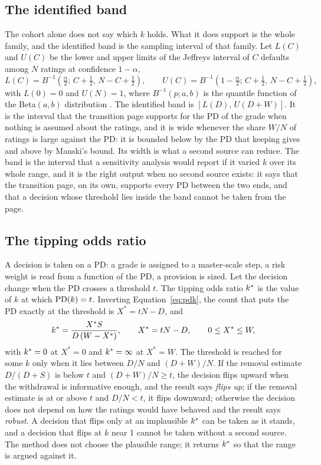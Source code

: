 \subsection{The identified band}

The cohort alone does not say which $k$ holds. What it does support is the whole family, and the identified band is the sampling interval of that family. Let $L(C)$ and $U(C)$ be the lower and upper limits of the Jeffreys interval of $C$ defaults among $N$ ratings at confidence $1-\alpha$,
\begin{equation}
L(C)=B^{-1}\!\left(\tfrac{\alpha}{2};\,C+\tfrac12,\,N-C+\tfrac12\right),\qquad U(C)=B^{-1}\!\left(1-\tfrac{\alpha}{2};\,C+\tfrac12,\,N-C+\tfrac12\right),
\label{eq:jeffreys}
\end{equation}
with $L(0)=0$ and $U(N)=1$, where $B^{-1}(p;a,b)$ is the quantile function of the Beta$(a,b)$ distribution \citep{brown2001}. The identified band is $[L(D),\,U(D+W)]$. It is the interval that the transition page supports for the PD of the grade when nothing is assumed about the \wdn{} ratings, and it is wide whenever the share $W/N$ of \wdn{} ratings is large against the PD: it is bounded below by the PD that keeping gives and above by Manski's bound. Its width is what a second source can reduce. The band is the interval that a sensitivity analysis would report if it varied $k$ over its whole range, and it is the right output when no second source exists: it says that the transition page, on its own, supports every PD between the two ends, and that a decision whose threshold lies inside the band cannot be taken from the page.

\subsection{The tipping odds ratio}

A decision is taken on a PD: a grade is assigned to a master-scale step, a risk weight is read from a function of the PD, a provision is sized. Let the decision change when the PD crosses a threshold $t$. The tipping odds ratio $k^{*}$ is the value of $k$ at which $\mathrm{PD}(k)=t$. Inverting Equation~\eqref{eq:pdk}, the count that puts the PD exactly at the threshold is $X^{\ast}=tN-D$, and
\begin{equation}
k^{*}=\frac{X^{\ast}S}{D\,(W-X^{\ast})},\qquad X^{\ast}=tN-D,\qquad 0\le X^{\ast}\le W,
\label{eq:tip}
\end{equation}
with $k^{*}=0$ at $X^{\ast}=0$ and $k^{*}=\infty$ at $X^{\ast}=W$. The threshold is reached for some $k$ only when it lies between $D/N$ and $(D+W)/N$. If the removal estimate $D/(D+S)$ is below $t$ and $(D+W)/N\ge t$, the decision flips upward when the withdrawal is informative enough, and the result says \emph{flips up}; if the removal estimate is at or above $t$ and $D/N<t$, it flips downward; otherwise the decision does not depend on how the \wdn{} ratings would have behaved and the result says \emph{robust}. A decision that flips only at an implausible $k^{*}$ can be taken as it stands, and a decision that flips at $k$ near 1 cannot be taken without a second source. The method does not choose the plausible range; it returns $k^{*}$ so that the range is argued against it.

